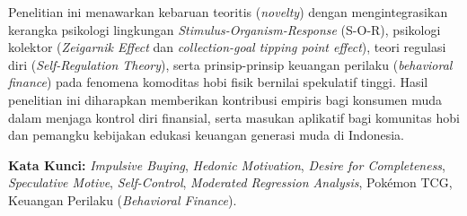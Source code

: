 \documentclass[12pt,a4paper]{article}
\numberwithin{equation}{section}
\numberwithin{table}{section}
\numberwithin{figure}{section}
\begin{document}
\begin{singlespace}
Penelitian ini menawarkan kebaruan teoritis (\emph{novelty}) dengan mengintegrasikan kerangka psikologi lingkungan \emph{Stimulus-Organism-Response} (S-O-R), psikologi kolektor (\emph{Zeigarnik Effect} dan \emph{collection-goal tipping point effect}), teori regulasi diri (\emph{Self-Regulation Theory}), serta prinsip-prinsip keuangan perilaku (\emph{behavioral finance}) pada fenomena komoditas hobi fisik bernilai spekulatif tinggi. Hasil penelitian ini diharapkan memberikan kontribusi empiris bagi konsumen muda dalam menjaga kontrol diri finansial, serta masukan aplikatif bagi komunitas hobi dan pemangku kebijakan edukasi keuangan generasi muda di Indonesia.

\vspace{0.3cm}
\noindent\textbf{Kata Kunci:} \emph{Impulsive Buying}, \emph{Hedonic Motivation}, \emph{Desire for Completeness}, \emph{Speculative Motive}, \emph{Self-Control}, \emph{Moderated Regression Analysis}, Pok\'emon TCG, Keuangan Perilaku (\emph{Behavioral Finance}).
\end{singlespace}
\end{document}
